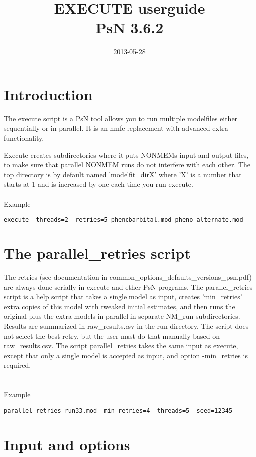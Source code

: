 \documentclass[a4paper,12pt]{article}
\title{EXECUTE userguide\\ \vspace{2 mm} {\large PsN 3.6.2}}
\date{2013-05-28}
\begin{document}
\maketitle


\section{Introduction}

The execute script is a PsN tool allows you to run multiple modelfiles either sequentially or in parallel. It is an nmfe replacement with advanced extra
functionality.

Execute creates subdirectories where it puts NONMEMs input and output files, to make sure that parallel NONMEM runs do not interfere with each other.
The top directory is by default named 'modelfit\_dirX' where 'X' is a number that starts at 1 and is increased by one each time you run execute.
\\
\\
Example
\begin{verbatim}
execute -threads=2 -retries=5 phenobarbital.mod pheno_alternate.mod
\end{verbatim}

\section{The parallel\_retries script}

The retries (see documentation in common\_options\_defaults\_versions\_psn.pdf) are always done serially in execute and other PsN programs. The parallel\_retries script is a help script that takes a single model as input, creates 'min\_retries' extra copies of this model with tweaked initial estimates, and then runs the original plus the extra models in parallel in separate NM\_run subdirectories. Results are summarized in raw\_results.csv in the run directory. The script does not select the best retry, but the user must do that manually based on raw\_results.csv. The script parallel\_retries takes the same input as execute, except that only a single model is accepted as input, and option -min\_retries is required. 
\\
\\
\\
Example
\begin{verbatim}
parallel_retries run33.mod -min_retries=4 -threads=5 -seed=12345
\end{verbatim}

\section{Input and options}
\end{document}
